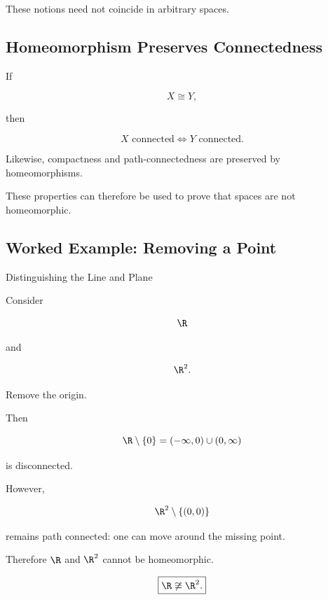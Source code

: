 These notions need not coincide in arbitrary spaces.

\subsection{Homeomorphism Preserves Connectedness}
\label{subsec:homeomorphism-connectedness}

If

\[
X\cong Y,
\]

then

\[
\boxed{
X\text{ connected}
\iff
Y\text{ connected}.
}
\]

Likewise, compactness and path-connectedness are preserved by
homeomorphisms.

These properties can therefore be used to prove that spaces are not
homeomorphic.

\subsection{Worked Example: Removing a Point}
\label{subsec:worked-removing-point}

\begin{workedexamplebox}{Distinguishing the Line and Plane}

Consider

\[
\R
\]

and

\[
\R^2.
\]

Remove the origin.

Then

\[
\R\setminus\{0\}
=
(-\infty,0)\cup(0,\infty)
\]

is disconnected.

However,

\[
\R^2\setminus\{(0,0)\}
\]

remains path connected: one can move around the missing point.

Therefore \(\R\) and \(\R^2\) cannot be homeomorphic.

\begin{answerbox}
\[
\boxed{
\R\not\cong\R^2.
}
\]
\end{answerbox}
\end{workedexamplebox}

